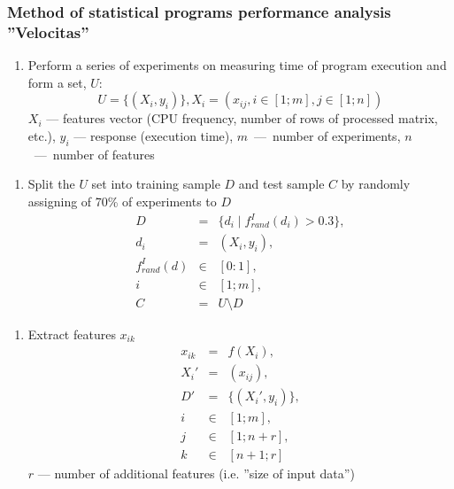 \documentclass{beamer}
\newcounter{saveenumi}
\newcommand{\seti}{\setcounter{saveenumi}{\value{enumi}}}
\newcommand{\conti}{\setcounter{enumi}{\value{saveenumi}}}
\begin{document}
\begin{frame}
\frametitle{Method of statistical programs performance analysis ''Velocitas''}

	\begin{enumerate}
		\item Perform a series of experiments on measuring time of program execution and form a set, $U$:
			\begin{equation*}
				U = \{ ( X_i, y_i ) \}, X_i = (x_{ij}, i \in [1;m], j \in [1;n])
			\end{equation*}
		$X_i$ --- features vector (CPU frequency, number of rows of processed matrix, etc.), $y_i$ --- response (execution time), $m$~---~number of experiments, $n$~---~number of features
		\seti
	\end{enumerate}

\end{frame}

\begin{frame}
	\begin{enumerate}
		\conti
		\item Split the $U$ set into training sample $D$ and test sample $C$ by randomly assigning of 70\% of experiments to $D$
			\begin{eqnarray}
				D &=& \{d_i \mid f_{rand}^I(d_i) > 0.3\}, \\
				d_i &=& (X_i, y_i), \\
				f_{rand}^I(d) &\in & [0:1], \\
				i &\in & [1;m], \\
				C &=& U \setminus D
			\end{eqnarray}
		\seti
	\end{enumerate}
\end{frame}


\begin{frame}
	\begin{enumerate}
		\conti
		\item Extract features $x_{ik}$
			\begin{eqnarray}
				x_{ik} &=& f(X_i), \\
				X_i' &=& (x_{ij}) , \\
				D' &=& \{ (X_i' , y_i) \}, \\
				i &\in & [1;m], \\
				j &\in & [1;n+r], \\
				k &\in & [n+1;r]
			\end{eqnarray}
			$r$ --- number of additional features (i.e. ''size of input data'')
		\seti
	\end{enumerate}
\end{frame}
\end{document}
